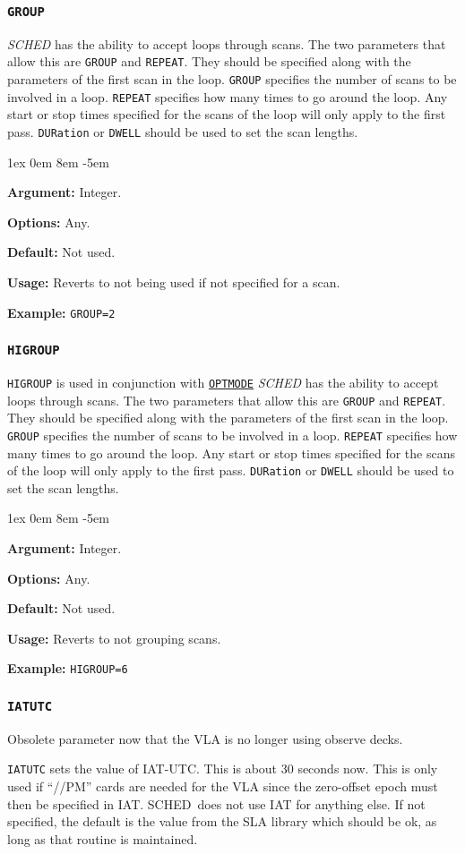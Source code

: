 \documentclass{report}
\newcommand{\schedb}{{\sc SCHED~}}
\newcommand{\rcwbox}[5]{
  \begin{list}{}{\parsep 1ex  \itemsep 0em
                 \leftmargin 8em  \itemindent -5em }
    \item {\bf Argument:} #1
    \item {\bf Options:}  #2
    \item {\bf Default:}  #3
    \item {\bf Usage:}    #4
    \item {\bf Example:}  #5
  \end{list}
}
\begin{document}
\subsubsection{\label{MP:GROUP}{\tt GROUP}}

{\em SCHED} has the ability to accept loops through scans.  The two
parameters that allow this are {\tt GROUP} and {\tt REPEAT}.  They
should be specified along with the parameters of the first scan in the
loop.  {\tt GROUP} specifies the number of scans to be involved in a
loop.  {\tt REPEAT} specifies how many times to go around the loop.
Any start or stop times specified for the scans of the loop will
only apply to the first pass.  {\tt DURation} or {\tt DWELL} should
be used to set the scan lengths.

\rcwbox
{Integer.}
{Any.}
{Not used.}
{Reverts to not being used if not specified for a scan.}
{{\tt GROUP=2}}

\subsubsection{\label{MP:HIGROUP}{\tt HIGROUP}}

{\tt HIGROUP} is used in conjunction with 
{\hyperref[MP:OPTMODE]{{\tt OPTMODE}}}
{\em SCHED} has the ability to accept loops through scans.  The two
parameters that allow this are {\tt GROUP} and {\tt REPEAT}.  They
should be specified along with the parameters of the first scan in the
loop.  {\tt GROUP} specifies the number of scans to be involved in a
loop.  {\tt REPEAT} specifies how many times to go around the loop.
Any start or stop times specified for the scans of the loop will
only apply to the first pass.  {\tt DURation} or {\tt DWELL} should
be used to set the scan lengths.

\rcwbox
{Integer.}
{Any.}
{Not used.}
{Reverts to not grouping scans.}
{{\tt HIGROUP=6}}


\subsubsection{\label{MP:IATUTC}{\tt IATUTC}}

Obsolete parameter now that the VLA is no longer using observe decks.

{\tt IATUTC} sets the value of IAT-UTC. This is about 30 seconds now.
This is only used if ``//PM'' cards are needed for the VLA since the
zero-offset epoch must then be specified in IAT. \schedb does not
use IAT for anything else.  If not specified, the default is the
value from the SLA library which should be ok, as long as that
routine is maintained.
\end{document}
